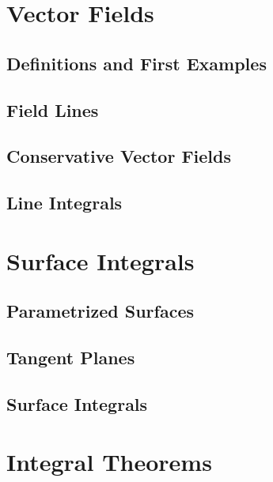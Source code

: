 \documentclass[12pt,letterpaper, openany]{book}
\begin{document}
\chapter{Vector Fields}
\section{Definitions and First Examples}

\section{Field Lines}

\section{Conservative Vector Fields}

\section{Line Integrals}


\chapter{Surface Integrals}
\section{Parametrized Surfaces}

\section{Tangent Planes}

\section{Surface Integrals}

%
%

\chapter{Integral Theorems}
\end{document}

